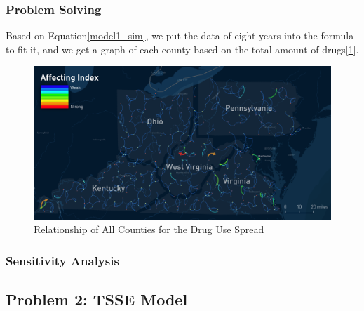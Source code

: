 \documentclass{mcmthesis}
\begin{document}
\subsubsection{Problem Solving}
Based on Equation\eqref{model1_sim}, we put the data of eight years into the formula to fit it, and we get a graph of each county based on the total amount of drugs[\ref{all_relation}].
\begin{figure}[ht]
	\centering
	\includegraphics[width=15cm]{figure-release/Model1.FlowMap.png}
	\caption{Relationship of All Counties for the Drug Use Spread}\label{all_relation}
\end{figure}



\subsubsection{Sensitivity Analysis}
\cite{6}

\subsection{Problem 2: TSSE Model}
\end{document}

